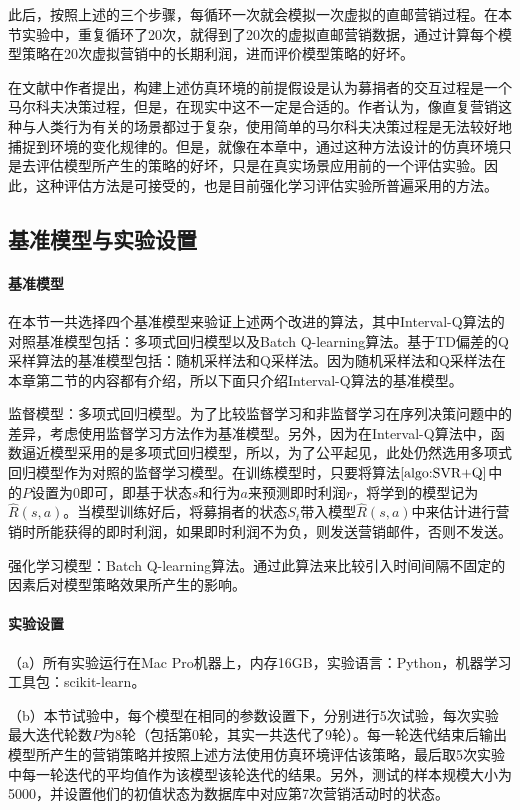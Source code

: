 此后，按照上述的三个步骤，每循环一次就会模拟一次虚拟的直邮营销过程。在本节实验中，重复循环了20次，就得到了20次的虚拟直邮营销数据，通过计算每个模型策略在20次虚拟营销中的长期利润，进而评价模型策略的好坏。

在文献\citep{pednault2002sequential}中作者提出，构建上述仿真环境的前提假设是认为募捐者的交互过程是一个马尔科夫决策过程，但是，在现实中这不一定是合适的。作者认为，像直复营销这种与人类行为有关的场景都过于复杂，使用简单的马尔科夫决策过程是无法较好地捕捉到环境的变化规律的。但是，就像在本章中，通过这种方法设计的仿真环境只是去评估模型所产生的策略的好坏，只是在真实场景应用前的一个评估实验。因此，这种评估方法是可接受的，也是目前强化学习评估实验所普遍采用的方法。

\subsection{基准模型与实验设置}
\paragraph{基准模型}
在本节一共选择四个基准模型来验证上述两个改进的算法，其中Interval-Q算法的对照基准模型包括：多项式回归模型以及Batch Q-learning算法\citep{pednault2002sequential}。基于TD偏差的Q采样算法的基准模型包括：随机采样法和Q采样法。因为随机采样法和Q采样法在本章第二节的内容都有介绍，所以下面只介绍Interval-Q算法的基准模型。

监督模型：多项式回归模型。为了比较监督学习和非监督学习在序列决策问题中的差异，考虑使用监督学习方法作为基准模型。另外，因为在Interval-Q算法中，函数逼近模型采用的是多项式回归模型，所以，为了公平起见，此处仍然选用多项式回归模型作为对照的监督学习模型。在训练模型时，只要将算法$\ref{algo:SVR+Q}$中的$P$设置为0即可，即基于状态$s$和行为$a$来预测即时利润$r$，将学到的模型记为$\hat{R}(s,a)$。当模型训练好后，将募捐者的状态$S_{t}$带入模型$\hat{R}(s,a)$中来估计进行营销时所能获得的即时利润，如果即时利润不为负，则发送营销邮件，否则不发送。

强化学习模型：Batch Q-learning算法。通过此算法来比较引入时间间隔不固定的因素后对模型策略效果所产生的影响。


\paragraph{实验设置}
（a）所有实验运行在Mac Pro机器上，内存16GB，实验语言：Python，机器学习工具包：scikit-learn。

（b）本节试验中，每个模型在相同的参数设置下，分别进行5次试验，每次实验最大迭代轮数$P$为8轮（包括第0轮，其实一共迭代了9轮）。每一轮迭代结束后输出模型所产生的营销策略并按照上述方法使用仿真环境评估该策略，最后取5次实验中每一轮迭代的平均值作为该模型该轮迭代的结果。另外，测试的样本规模大小为5000，并设置他们的初值状态为数据库中对应第7次营销活动时的状态。

